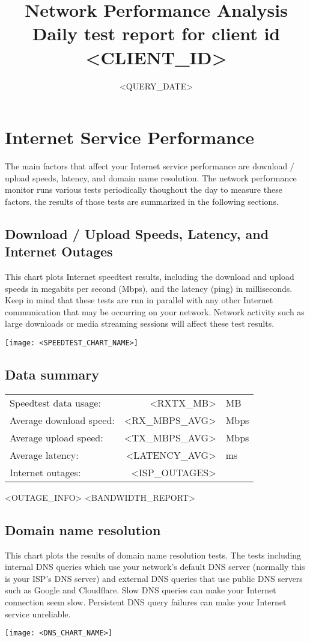 \documentclass[11pt]{article}
\title{\vspace{-0.5in}\huge{Network Performance Analysis\\\large Daily test report for client id <CLIENT_ID>}\vspace{-0.5in}
}
\begin{document}
\setlength{\parindent}{0pt}
\date{<QUERY_DATE>}
\maketitle
\section{Internet Service Performance}
The main factors that affect your Internet service performance are download / upload speeds, latency, and domain name resolution. The network performance monitor runs various tests periodically thoughout the day to measure these factors, the results of those tests are summarized in the following sections.
\subsection{Download / Upload Speeds, Latency, and Internet Outages}
This chart plots Internet speedtest results, including the download and upload speeds in megabits per second (Mbps), and the latency (ping) in milliseconds. Keep in mind that these tests are run in parallel with any other Internet communication that may be occurring on your network. Network activity such as large downloads or media streaming sessions will affect these test results. 
\begin{center}
\texttt{[image: <SPEEDTEST\_CHART\_NAME>]}
\end{center}
\subsection{Data summary}
\begin{tabular}{@{}l@{\hskip 0.1in}r@{\hskip 0.025in}l@{}}
Speedtest data usage: & <RXTX_MB> & MB \\
Average download speed: & <RX_MBPS_AVG> & Mbps \\
Average upload speed: & <TX_MBPS_AVG> & Mbps \\
Average latency: & <LATENCY_AVG> & ms \\
Internet outages: & <ISP_OUTAGES> & \\
\end{tabular}

\medskip

<OUTAGE_INFO>
<BANDWIDTH_REPORT>

\subsection{Domain name resolution}
This chart plots the results of domain name resolution tests. The tests including internal DNS queries which use your network's default DNS server (normally this is your ISP's DNS server) and external DNS queries that use public DNS servers such as Google and Cloudflare. Slow DNS queries can make your Internet connection seem slow. Persistent DNS query failures can make your Internet service unreliable.
\begin{center}
\texttt{[image: <DNS\_CHART\_NAME>]}
\end{center}
\end{document}
